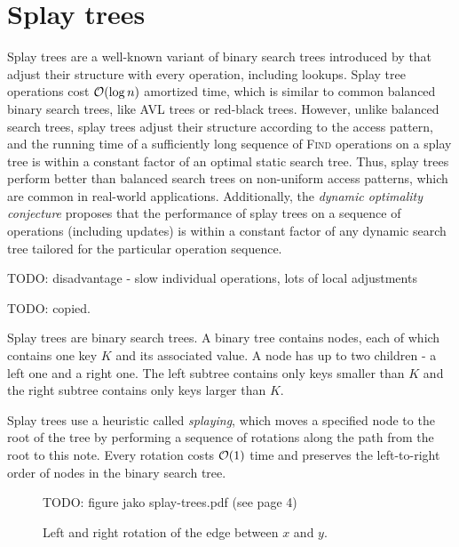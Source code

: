 \chapter{Splay trees}
\label{chapter:splay}
Splay trees are a well-known variant of binary search trees introduced
by \cite{splay} that adjust their structure with every operation, including
lookups. Splay tree operations cost $\mathcal{O}(\log n)$ amortized time, which is
similar to common balanced binary search trees, like AVL trees or
red-black trees.
However, unlike balanced search trees, splay trees adjust their structure
according to the access pattern, and the running time of a sufficiently long
sequence of \textsc{Find} operations on a splay tree is within a constant
factor of an optimal static search tree.
Thus, splay trees perform better than balanced search trees on non-uniform
access patterns, which are common in real-world applications.
Additionally, the \textit{dynamic optimality conjecture} proposes that
the performance of splay trees on a sequence of operations (including updates)
is within a constant factor of any dynamic search tree tailored for
the particular operation sequence.

TODO: disadvantage - slow individual operations, lots of local adjustments

TODO: copied.

Splay trees are binary search trees. A binary tree contains nodes, each of which
contains one key $K$ and its associated value.
A node has up to two children - a left one and a right one.
The left subtree contains only keys smaller than $K$ and the right subtree
contains only keys larger than $K$.


Splay trees use a heuristic called \textit{splaying}, which moves a specified
node to the root of the tree by performing a sequence of rotations along the
path from the root to this note. Every rotation costs $\mathcal{O}(1)$ time and preserves
the left-to-right order of nodes in the binary search tree.

\begin{figure}
\centering
TODO: figure jako splay-trees.pdf (see page 4)
\caption{Left and right rotation of the edge between $x$ and $y$.}
\end{figure}

